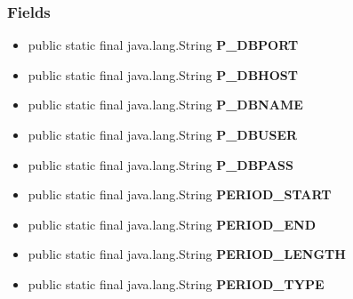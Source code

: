 {{{{{{{{\subsubsection{Fields}{
\begin{itemize}
\item{
\label{it.unisa.sesa.repominer.preferences.PreferenceConstants.P_DBPORT}\hypertarget{it.unisa.sesa.repominer.preferences.PreferenceConstants.P_DBPORT}{public static final java.lang.String {\bf  P\_DBPORT}}
}
\item{
\label{it.unisa.sesa.repominer.preferences.PreferenceConstants.P_DBHOST}\hypertarget{it.unisa.sesa.repominer.preferences.PreferenceConstants.P_DBHOST}{public static final java.lang.String {\bf  P\_DBHOST}}
}
\item{
\label{it.unisa.sesa.repominer.preferences.PreferenceConstants.P_DBNAME}\hypertarget{it.unisa.sesa.repominer.preferences.PreferenceConstants.P_DBNAME}{public static final java.lang.String {\bf  P\_DBNAME}}
}
\item{
\label{it.unisa.sesa.repominer.preferences.PreferenceConstants.P_DBUSER}\hypertarget{it.unisa.sesa.repominer.preferences.PreferenceConstants.P_DBUSER}{public static final java.lang.String {\bf  P\_DBUSER}}
}
\item{
\label{it.unisa.sesa.repominer.preferences.PreferenceConstants.P_DBPASS}\hypertarget{it.unisa.sesa.repominer.preferences.PreferenceConstants.P_DBPASS}{public static final java.lang.String {\bf  P\_DBPASS}}
}
\item{
\label{it.unisa.sesa.repominer.preferences.PreferenceConstants.PERIOD_START}\hypertarget{it.unisa.sesa.repominer.preferences.PreferenceConstants.PERIOD_START}{public static final java.lang.String {\bf  PERIOD\_START}}
}
\item{
\label{it.unisa.sesa.repominer.preferences.PreferenceConstants.PERIOD_END}\hypertarget{it.unisa.sesa.repominer.preferences.PreferenceConstants.PERIOD_END}{public static final java.lang.String {\bf  PERIOD\_END}}
}
\item{
\label{it.unisa.sesa.repominer.preferences.PreferenceConstants.PERIOD_LENGTH}\hypertarget{it.unisa.sesa.repominer.preferences.PreferenceConstants.PERIOD_LENGTH}{public static final java.lang.String {\bf  PERIOD\_LENGTH}}
}
\item{
\label{it.unisa.sesa.repominer.preferences.PreferenceConstants.PERIOD_TYPE}\hypertarget{it.unisa.sesa.repominer.preferences.PreferenceConstants.PERIOD_TYPE}{public static final java.lang.String {\bf  PERIOD\_TYPE}}
}
\end{itemize}}}}}}}}}}
